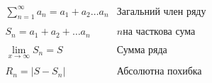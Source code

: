 
$$
\begin{array}{rl}
  \sum^\infty_{n=1} a_n = a_1+a_2 \ldots a_n & {\text{Загальний член ряду}} \\
  \\
  S_n = a_1 + a_2 + \ldots a_n & {\text{$n$на часткова сума}} \\
  \\
  \lim_{x \to \infty}  S_n = S & {\text{Сумма ряда}} \\
  \\
  R_n = \big| S-S_n \big| & {\text{Абсолютна похибка}} \\
  \\
\end{array}
$$
